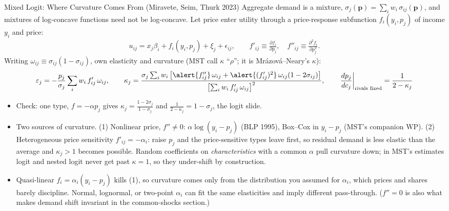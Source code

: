 \documentclass[aspectratio=169,10pt]{beamer}
\begin{document}
\begin{frame}{Mixed Logit: Where Curvature Comes From (Miravete, Seim, Thurk 2023)}
\footnotesize
Aggregate demand is a mixture, $\sigma_j(\symbf{p}) = \sum_i w_i\, \sigma_{ij}(\symbf{p})$, and mixtures of log-concave functions need not be log-concave. Let price enter utility through a \alert{price-response subfunction} $f_i(y_i, p_j)$ of income $y_i$ and price:
\begin{align*}
u_{ij} = x_j \beta_i + f_i(y_i, p_j) + \xi_j + \epsilon_{ij}, \qquad f'_{ij} \equiv \frac{\partial f_i}{\partial p_j}, \quad f''_{ij} \equiv \frac{\partial^2 f_i}{\partial p_j^2}.
\end{align*}
Writing $\omega_{ij} \equiv \sigma_{ij}(1-\sigma_{ij})$, own elasticity and curvature (MST call $\kappa$ ``$\rho$''; it is Mr\'azov\'a--Neary's $\kappa$):
\begin{align*}
\varepsilon_j = -\frac{p_j}{\sigma_j}\sum_i w_i\, f'_{ij}\, \omega_{ij},
\qquad
\kappa_j = \frac{\sigma_j \sum_i w_i \left[ \alert{f''_{ij}}\, \omega_{ij} + \alert{(f'_{ij})^2}\, \omega_{ij} (1 - 2\sigma_{ij}) \right]}{\left[ \sum_i w_i\, f'_{ij}\, \omega_{ij} \right]^2},
\qquad \left.\frac{dp_j}{dc_j}\right|_{\text{rivals fixed}} = \frac{1}{2 - \kappa_j}
\end{align*}
\vspace{-0.3cm}
\begin{itemize}
\item Check: one type, $f = -\alpha p_j$ gives $\kappa_j = \frac{1-2\sigma_j}{1-\sigma_j}$ and $\frac{1}{2-\kappa_j} = 1 - \sigma_j$, the logit slide.
\item Two sources of curvature. (1) \alert{Nonlinear price}, $f'' \neq 0$: $\alpha \log(y_i - p_j)$ (BLP 1995), Box--Cox in $y_i - p_j$ (MST's companion WP). (2) \alert{Heterogeneous price sensitivity} $f'_{ij} = -\alpha_i$: raise $p_j$ and the price-sensitive types leave first, so residual demand is less elastic than the average and $\kappa_j > 1$ becomes possible. Random coefficients on \emph{characteristics} with a common $\alpha$ pull curvature down; in MST's estimates logit and nested logit never get past $\kappa = 1$, so they under-shift by construction.
\item Quasi-linear $f_i = \alpha_i (y_i - p_j)$ kills (1), so curvature comes only from the \alert{distribution you assumed for $\alpha_i$}, which prices and shares barely discipline. Normal, lognormal, or two-point $\alpha_i$ can fit the same elasticities and imply different pass-through. ($f'' = 0$ is also what makes demand shift invariant in the common-shocks section.)
\end{itemize}
\end{frame}
\end{document}
